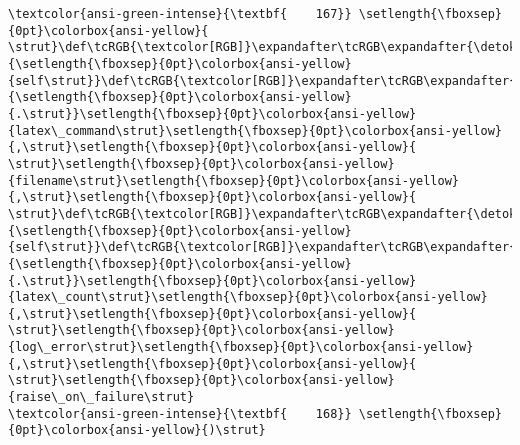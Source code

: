 \documentclass[11pt]{article}
\begin{document}
\begin{Verbatim}[commandchars=\\\{\}, frame=single, framerule=2mm, rulecolor=\color{outerrorbackground}]
\textcolor{ansi-green-intense}{\textbf{    167}} \setlength{\fboxsep}{0pt}\colorbox{ansi-yellow}{    \strut}\def\tcRGB{\textcolor[RGB]}\expandafter\tcRGB\expandafter{\detokenize{0,135,0}}{\setlength{\fboxsep}{0pt}\colorbox{ansi-yellow}{self\strut}}\def\tcRGB{\textcolor[RGB]}\expandafter\tcRGB\expandafter{\detokenize{98,98,98}}{\setlength{\fboxsep}{0pt}\colorbox{ansi-yellow}{.\strut}}\setlength{\fboxsep}{0pt}\colorbox{ansi-yellow}{latex\_command\strut}\setlength{\fboxsep}{0pt}\colorbox{ansi-yellow}{,\strut}\setlength{\fboxsep}{0pt}\colorbox{ansi-yellow}{ \strut}\setlength{\fboxsep}{0pt}\colorbox{ansi-yellow}{filename\strut}\setlength{\fboxsep}{0pt}\colorbox{ansi-yellow}{,\strut}\setlength{\fboxsep}{0pt}\colorbox{ansi-yellow}{ \strut}\def\tcRGB{\textcolor[RGB]}\expandafter\tcRGB\expandafter{\detokenize{0,135,0}}{\setlength{\fboxsep}{0pt}\colorbox{ansi-yellow}{self\strut}}\def\tcRGB{\textcolor[RGB]}\expandafter\tcRGB\expandafter{\detokenize{98,98,98}}{\setlength{\fboxsep}{0pt}\colorbox{ansi-yellow}{.\strut}}\setlength{\fboxsep}{0pt}\colorbox{ansi-yellow}{latex\_count\strut}\setlength{\fboxsep}{0pt}\colorbox{ansi-yellow}{,\strut}\setlength{\fboxsep}{0pt}\colorbox{ansi-yellow}{ \strut}\setlength{\fboxsep}{0pt}\colorbox{ansi-yellow}{log\_error\strut}\setlength{\fboxsep}{0pt}\colorbox{ansi-yellow}{,\strut}\setlength{\fboxsep}{0pt}\colorbox{ansi-yellow}{ \strut}\setlength{\fboxsep}{0pt}\colorbox{ansi-yellow}{raise\_on\_failure\strut}
\textcolor{ansi-green-intense}{\textbf{    168}} \setlength{\fboxsep}{0pt}\colorbox{ansi-yellow}{)\strut}


\end{Verbatim}
\end{document}

